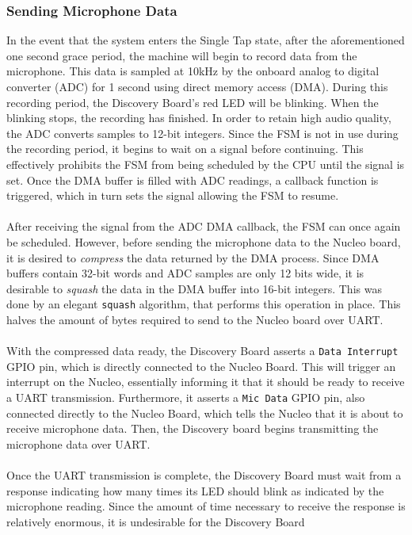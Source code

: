 \subsubsection{Sending Microphone Data}
In the event that the system enters the Single Tap state, after the aforementioned one second grace
period, the machine will begin to record data from the microphone. This data is sampled at 10kHz by
the onboard analog to digital converter (ADC) for 1 second using direct memory access (DMA). During
this recording period, the Discovery Board's red LED will be blinking. When the blinking stops, the
recording has finished. In
order to retain high audio quality, the ADC converts samples to 12-bit integers. Since
the FSM is not in use during the recording period, it begins to wait on a signal before continuing.
This effectively prohibits the FSM from being scheduled by the CPU until the signal is set. Once
the DMA buffer is filled with ADC readings, a callback function is triggered, which in turn sets the
signal allowing the FSM to resume.\\\\
After receiving the signal from the ADC DMA callback, the FSM can once again be scheduled. However,
before sending the microphone data to the Nucleo board, it is desired to \textit{compress} the data
returned by the DMA process. Since DMA buffers contain 32-bit words and ADC samples are only 12 bits
wide, it is desirable to \textit{squash} the data in the DMA buffer into 16-bit integers. This was
done by an elegant \texttt{squash} algorithm, that performs this operation in place. This halves the
amount of bytes required to send to the Nucleo board over UART.\\\\
With the compressed data ready, the Discovery Board asserts a \texttt{Data Interrupt} GPIO pin,
which is directly connected to the Nucleo Board. This will trigger an interrupt on the Nucleo,
essentially informing it that it should be ready to receive a UART transmission. Furthermore, it
asserts a \texttt{Mic Data} GPIO pin, also connected directly to the Nucleo Board, which tells the
Nucleo that it is about to receive microphone data. Then, the Discovery
board begins transmitting the microphone data over UART.\\\\
Once the UART transmission is complete, the Discovery Board must wait from a response indicating how
many times its LED should blink as indicated by the microphone reading. Since the amount of time
necessary to receive the response is relatively enormous, it is undesirable for the Discovery Board
